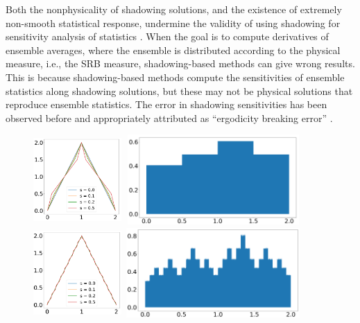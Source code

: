 Both the nonphysicality of shadowing solutions, and the existence of extremely non-smooth statistical response, undermine the validity of using shadowing for sensitivity analysis of statistics \cite{qiqi-lss}\cite{angxiu-lss}\cite{lasagna}. When the goal is to compute derivatives of ensemble averages, where the ensemble
is distributed according to the physical measure, i.e., the SRB measure, shadowing-based methods can give wrong results. This is because shadowing-based methods compute the sensitivities of ensemble statistics along shadowing solutions, but these may not be physical solutions that reproduce ensemble statistics. The error in shadowing sensitivities has been observed
before and appropriately attributed as ``ergodicity breaking error'' \cite{patrick} \cite{angxiu-error}. 
\begin{figure}
    \centering
    \includegraphics[width=0.3\textwidth,height=1.35in]{osc_tent_0.png}
     \includegraphics[width=0.6\textwidth,height=1.35in]{osc_tent_dens_0.1_0.png}
    \includegraphics[width=0.3\textwidth,height=1.35in]{osc_tent_3.png}
     \includegraphics[width=0.6\textwidth,height=1.35in]{osc_tent_dens_0.1_3.png}

\end{figure}

